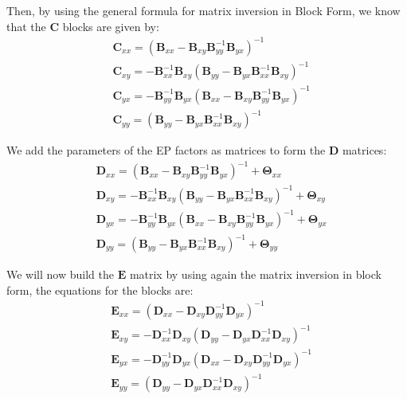 Then, by using the general formula for matrix inversion in Block Form, we know that the $\mathbf{C}$ blocks are given by:
\begin{align}
& \mathbf{C}_{xx} = (\mathbf{B}_{xx}-\mathbf{B}_{xy}\mathbf{B}_{yy}^{-1}\mathbf{B}_{yx})^{-1} \\
& \mathbf{C}_{xy} = -\mathbf{B}_{xx}^{-1}\mathbf{B}_{xy}(\mathbf{B}_{yy}-\mathbf{B}_{yx}\mathbf{B}_{xx}^{-1}\mathbf{B}_{xy})^{-1} \\
& \mathbf{C}_{yx} = -\mathbf{B}_{yy}^{-1}\mathbf{B}_{yx}(\mathbf{B}_{xx}-\mathbf{B}_{xy}\mathbf{B}_{yy}^{-1}\mathbf{B}_{yx})^{-1} \\
& \mathbf{C}_{yy} = (\mathbf{B}_{yy}-\mathbf{B}_{yx}\mathbf{B}_{xx}^{-1}\mathbf{B}_{xy})^{-1} 
\end{align}

We add the parameters of the EP factors as matrices to form the $\mathbf{D}$ matrices:
\begin{align}
& \mathbf{D}_{xx} = (\mathbf{B}_{xx}-\mathbf{B}_{xy}\mathbf{B}_{yy}^{-1}\mathbf{B}_{yx})^{-1} + \mathbf{\Theta}_{xx}\\
& \mathbf{D}_{xy} = -\mathbf{B}_{xx}^{-1}\mathbf{B}_{xy}(\mathbf{B}_{yy}-\mathbf{B}_{yx}\mathbf{B}_{xx}^{-1}\mathbf{B}_{xy})^{-1} + \mathbf{\Theta}_{xy}\\
& \mathbf{D}_{yx} = -\mathbf{B}_{yy}^{-1}\mathbf{B}_{yx}(\mathbf{B}_{xx}-\mathbf{B}_{xy}\mathbf{B}_{yy}^{-1}\mathbf{B}_{yx})^{-1} + \mathbf{\Theta}_{yx}\\
& \mathbf{D}_{yy} = (\mathbf{B}_{yy}-\mathbf{B}_{yx}\mathbf{B}_{xx}^{-1}\mathbf{B}_{xy})^{-1} + \mathbf{\Theta}_{yy}
\end{align}

We will now build the $\mathbf{E}$ matrix by using again the matrix inversion in block form, the equations for the blocks are:
\begin{align}
& \mathbf{E}_{xx} = (\mathbf{D}_{xx}-\mathbf{D}_{xy}\mathbf{D}_{yy}^{-1}\mathbf{D}_{yx})^{-1} \\
& \mathbf{E}_{xy} = -\mathbf{D}_{xx}^{-1}\mathbf{D}_{xy}(\mathbf{D}_{yy}-\mathbf{D}_{yx}\mathbf{D}_{xx}^{-1}\mathbf{D}_{xy})^{-1} \\
& \mathbf{E}_{yx} = -\mathbf{D}_{yy}^{-1}\mathbf{D}_{yx}(\mathbf{D}_{xx}-\mathbf{D}_{xy}\mathbf{D}_{yy}^{-1}\mathbf{D}_{yx})^{-1} \\
& \mathbf{E}_{yy} = (\mathbf{D}_{yy}-\mathbf{D}_{yx}\mathbf{D}_{xx}^{-1}\mathbf{D}_{xy})^{-1} 
\end{align}


